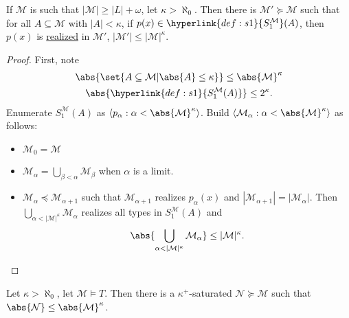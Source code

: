 \documentclass{article}
\let\models\vDash
\newcommand{\M}{\mathcal{M}}
\renewcommand{\N}{\mathcal{N}}
\begin{document}
\begin{lemma}
  If $\M$ is such that $|\M| \geq |L| + \omega$, let $\kappa > \aleph_0$.
  Then there is $\M' \succcurlyeq \M$ such that for all $A \subseteq \M$ with $|A|< \kappa$, if $p(x) \in \hyperlink{def:s1}{S^\M_1}(A)$, then $p(x)$ is \hyperlink{def:type}{realized} in $\M'$, $|\M'| \leq |\M|^\kappa$.
\end{lemma}
\begin{proof}
  First, note
  \begin{gather*}
    \abs{\set{A \subseteq \M | \abs{A} \leq \kappa}} \leq \abs{\M}^\kappa \\
    \abs{\hyperlink{def:s1}{S_1^\M(A)}} \leq 2^\kappa.
  \end{gather*}
  Enumerate $S_1^\M(A)$ as $\langle p_\alpha : \alpha < \abs{\M}^\kappa \rangle$.
  Build $\langle \M_\alpha : \alpha < \abs{\M}^\kappa \rangle$ as follows:
  \begin{itemize}
    \item $\M_0 = \M$
    \item $\M_\alpha = \bigcup_{\beta < \alpha} \M_\beta$ when $\alpha$ is a limit.
  \item $\M_\alpha \preccurlyeq \M_{\alpha + 1}$ such that $\M_{\alpha+1}$ realizes $p_\alpha(x)$ and $|\M_{\alpha+1}| = |\M_\alpha|$.
    Then $\bigcup_{\alpha < |\M|^\kappa} \M_\alpha$ realizes all types in $S_1^\M(A)$ and
    \begin{align*}
    \abs{\bigcup_{\alpha < |\M|^\kappa} \M_\alpha} \leq |\M|^\kappa. \qedhere
    \end{align*}
  \end{itemize}
\end{proof}
\begin{thm}
  Let $\kappa > \aleph_0$, let $\M \models T$. Then there is a $\kappa^+$-saturated $\mathcal{N} \succcurlyeq \M$ such that $\abs{\N} \leq \abs{\M}^\kappa$.
\end{thm}
\end{document}
